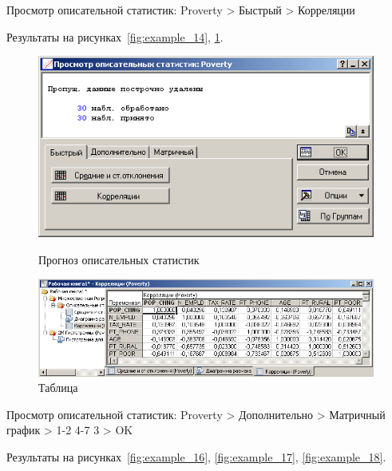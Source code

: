 Просмотр описательной статистик: Proverty > Быстрый > Корреляции

Результаты на рисунках~\ref{fig:example_14}, \ref{fig:example_15}.

\begin{figure}[!h]
  \centering
  \begin{minipage}{0.29\textwidth}
    \centering

    \includegraphics[width=0.99\textwidth]
    {inc/example_14.PNG}

    \caption{Прогноз описательных статистик}
    \label{fig:example_14}
  \end{minipage}
  \begin{minipage}{0.69\textwidth}
    \centering

    \includegraphics[width=0.99\textwidth]
    {inc/example_15.PNG}

    \caption{Таблица}
    \label{fig:example_15}
  \end{minipage}
\end{figure}

Просмотр описательной статистик: Proverty > Дополнительно > Матричный график > 1-2 4-7 3 > OK

Результаты на рисунках~\ref{fig:example_16}, \ref{fig:example_17}, \ref{fig:example_18}.

